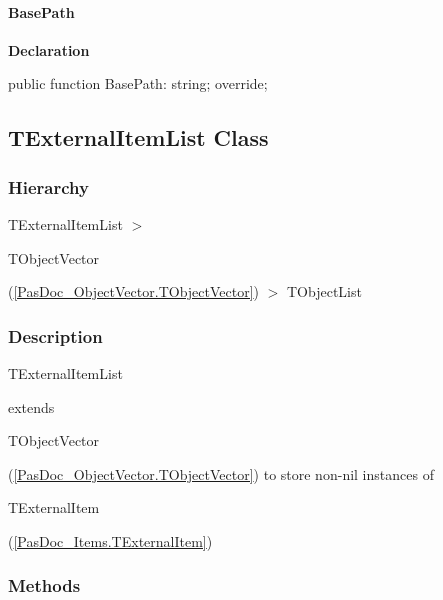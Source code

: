 \documentclass{report}
\newif\ifpdf
\begin{document}
\paragraph*{BasePath}\hspace*{\fill}

\label{PasDoc_Items.TExternalItem-BasePath}
\begin{list}{}{
\setlength{\itemindent}{0cm}
\setlength{\listparindent}{0cm}
\setlength{\leftmargin}{\evensidemargin}
\addtolength{\leftmargin}{\tmplength}
\settowidth{\labelsep}{X}
\addtolength{\leftmargin}{\labelsep}
\setlength{\labelwidth}{\tmplength}
}
\item[\textbf{Declaration}\hfill]
\ifpdf
\begin{flushleft}
\fi
\begin{ttfamily}
public function BasePath: string; override;\end{ttfamily}

\ifpdf
\end{flushleft}
\fi

\end{list}
\ifpdf
\subsection*{\large{\textbf{TExternalItemList Class}}\normalsize\hspace{1ex}\hrulefill}
\else
\subsection*{TExternalItemList Class}
\fi
\label{PasDoc_Items.TExternalItemList}
\subsubsection*{\large{\textbf{Hierarchy}}\normalsize\hspace{1ex}\hfill}
TExternalItemList {$>$} \begin{ttfamily}TObjectVector\end{ttfamily}(\ref{PasDoc_ObjectVector.TObjectVector}) {$>$} 
TObjectList
\subsubsection*{\large{\textbf{Description}}\normalsize\hspace{1ex}\hfill}
\begin{ttfamily}TExternalItemList\end{ttfamily} extends \begin{ttfamily}TObjectVector\end{ttfamily}(\ref{PasDoc_ObjectVector.TObjectVector}) to store non{-}nil instances of \begin{ttfamily}TExternalItem\end{ttfamily}(\ref{PasDoc_Items.TExternalItem})\subsubsection*{\large{\textbf{Methods}}\normalsize\hspace{1ex}\hfill}
\end{document}
